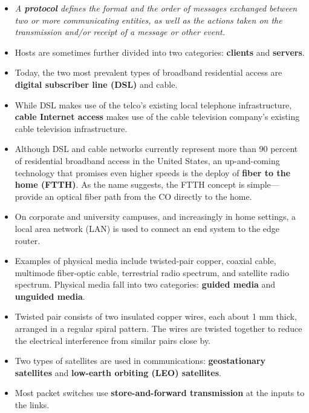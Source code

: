 \begin{itemize}
\item \textit{A \textbf{protocol} defines the format and the order of messages exchanged between two or more communicating entities, as well as the actions taken on the transmission and/or receipt of a message or other event.}

\item Hosts are sometimes further divided into two categories: \textbf{clients} and \textbf{servers}.

\item Today, the two most prevalent types of broadband residential access are \textbf{digital subscriber line (DSL)} and cable.

\item While DSL makes use of the telco's existing local telephone infrastructure, \textbf{cable Internet access} makes use of the cable television company's existing cable television infrastructure.

\item Although DSL and cable networks currently represent more than 90 percent of residential broadband access in the United States, an up-and-coming technology that promises even higher speeds is the deploy of \textbf{fiber to the home (FTTH)}. As the name suggests, the FTTH concept is simple---provide an optical fiber path from the CO directly to the home.

\item On corporate and university campuses, and increasingly in home settings, a local area network (LAN) is used to connect an end system to the edge router.

\item Examples of physical media include twisted-pair copper, coaxial cable, multimode fiber-optic cable, terrestrial radio spectrum, and satellite radio spectrum. Physical media fall into two categories: \textbf{guided media} and \textbf{unguided media}.

\item Twisted pair consists of two insulated copper wires, each about 1 mm thick, arranged in a regular spiral pattern. The wires are twisted together to reduce the electrical interference from similar pairs close by.

\item Two types of satellites are used in communications: \textbf{geostationary satellites} and \textbf{low-earth orbiting (LEO) satellites}.

\item Most packet switches use \textbf{store-and-forward transmission} at the inputs to the links.


\end{itemize}
